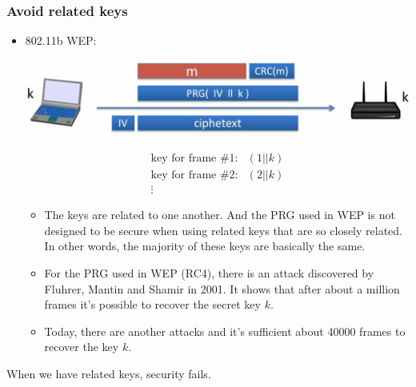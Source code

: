 \documentclass[12pt]{book}
\begin{document}
\subsubsection{Avoid related keys}
\begin{itemize}
	\item 802.11b WEP:
	\begin{center}
		\includegraphics[width=.9\textwidth]{wep}
	\end{center}
	$$\begin{array}{cc}
		\text{key for frame \#1:}&(1||k)\\
		\text{key for frame \#2:}&(2||k)\\
		\vdots&
	\end{array}$$
	\begin{itemize}
		\item The keys are related to one another. And the PRG used in WEP is not designed to be secure when using related keys that are so closely related. In other words, the majority of these keys are basically the same.
		\item For the PRG used in WEP (RC4), there is an attack discovered by Fluhrer, Mantin and Shamir in 2001. It shows that after about a million frames it's possible to recover the secret key $k$.
		\item Today, there are another attacks and it's sufficient about 40000 frames to recover the key $k$.
	\end{itemize}
\end{itemize}
When we have related keys, security fails.
\end{document}
